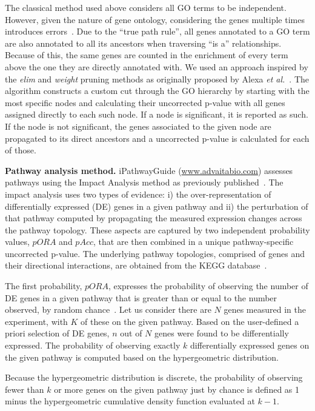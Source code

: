 \documentclass[Minh_PhD_thesis.tex]{subfiles}
\begin{document}
The classical method used above considers all GO terms to be independent. However, given the nature of gene ontology, considering the genes multiple times introduces errors~\cite{Rhee:2008, DraghiciBook:2011}. Due to the ``true path rule'', all  genes annotated to a GO term are also annotated to all its ancestors when traversing ``is a'' relationships. Because of this, the same genes are counted in the enrichment of every term above the one they are directly annotated with.  We used an approach inspired by  the \textit{elim} and \emph{weight} pruning methods as originally proposed by Alexa \textit{et al.}~\cite{Alexa:2006}. The algorithm constructs a custom cut through the GO hierarchy by starting with the most specific nodes and calculating their uncorrected p-value with all genes assigned directly to each such node. If a node is significant, it is reported as such. If the node is not significant, the genes associated to the given node are propagated to its direct ancestors and a uncorrected p-value is calculated for each of those. 

\textbf{Pathway analysis method.}  
iPathwayGuide (\url{www.advaitabio.com}) assesses pathways using the Impact Analysis method as previously published~\cite{DraghiciPE:2007, tarca2009novel, khatri2007}. The impact analysis uses two types of evidence: i) the over-representation of differentially expressed (DE) genes in a given pathway and ii) the perturbation of that pathway computed by propagating the measured expression changes across the pathway topology. These aspects are captured by two independent probability values, $pORA$ and $pAcc$, that are then combined in a unique pathway-specific uncorrected p-value. The underlying pathway topologies, comprised of genes and their directional interactions, are obtained from the KEGG database~\cite{ogata1999kegg, kanehisa2010kegg, kanehisa2012kegg,  kanehisa2014data}.

The first probability, $pORA$, expresses the probability of observing the number of DE genes in a given pathway that is greater than or equal to the number observed, by random chance~\cite{DraghiciOE2:2003,DraghiciBook:2011}. Let us consider there are $N$ genes measured in the experiment, with $K$ of these on the given pathway. Based on the user-defined a priori selection of DE genes, $n$ out of $N$ genes were found to be differentially expressed. The probability of observing exactly $k$ differentially expressed genes on the given pathway is computed based on the hypergeometric distribution.

Because the hypergeometric distribution is discrete, the probability of observing fewer than $k$ or more genes on the given pathway just by chance is defined as 1 minus  the hypergeometric cumulative density function evaluated at $k-1$.
\end{document}
